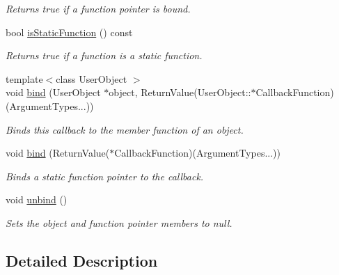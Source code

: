 \begin{DoxyCompactItemize}
\begin{DoxyCompactList}\small\item\em Returns true if a function pointer is bound. \end{DoxyCompactList}\item 
\mbox{\label{class_arcana_1_1_base_callback_a34a6a102d72802409883d5ec11e86f66}} 
bool \mbox{\hyperlink{class_arcana_1_1_base_callback_a34a6a102d72802409883d5ec11e86f66}{is\+Static\+Function}} () const
\begin{DoxyCompactList}\small\item\em Returns true if a function is a static function. \end{DoxyCompactList}\item 
{\footnotesize template$<$class User\+Object $>$ }\\void \mbox{\hyperlink{class_arcana_1_1_base_callback_af4de0a2c2e41f7e5e87d1e53ad6191d1}{bind}} (User\+Object $\ast$object, Return\+Value(User\+Object\+::$\ast$Callback\+Function)(Argument\+Types...))
\begin{DoxyCompactList}\small\item\em Binds this callback to the member function of an object. \end{DoxyCompactList}\item 
void \mbox{\hyperlink{class_arcana_1_1_base_callback_abceb1a28ee038b2aec2335e672f71559}{bind}} (Return\+Value($\ast$Callback\+Function)(Argument\+Types...))
\begin{DoxyCompactList}\small\item\em Binds a static function pointer to the callback. \end{DoxyCompactList}\item 
\mbox{\label{class_arcana_1_1_base_callback_afd3c163186a7017671e7b6fa5617722e}} 
void \mbox{\hyperlink{class_arcana_1_1_base_callback_afd3c163186a7017671e7b6fa5617722e}{unbind}} ()
\begin{DoxyCompactList}\small\item\em Sets the object and function pointer members to null. \end{DoxyCompactList}\end{DoxyCompactItemize}


\subsection{Detailed Description}

